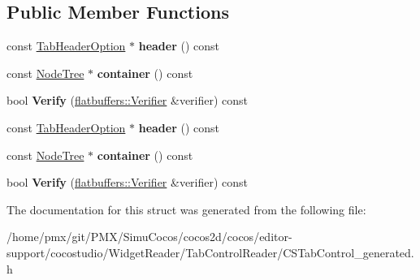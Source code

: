 \subsection*{Public Member Functions}
\begin{DoxyCompactItemize}
\item 
\mbox{\label{structflatbuffers_1_1TabItemOption_a7f8ca6692129f5380eb1d95a66fc40ab}} 
const \hyperlink{structflatbuffers_1_1TabHeaderOption}{Tab\+Header\+Option} $\ast$ {\bfseries header} () const
\item 
\mbox{\label{structflatbuffers_1_1TabItemOption_aa1d6ac89e8f0bde27d856a2922cd267a}} 
const \hyperlink{structflatbuffers_1_1NodeTree}{Node\+Tree} $\ast$ {\bfseries container} () const
\item 
\mbox{\label{structflatbuffers_1_1TabItemOption_a09ea1b5e69643e772f6cd6821c99ac66}} 
bool {\bfseries Verify} (\hyperlink{classflatbuffers_1_1Verifier}{flatbuffers\+::\+Verifier} \&verifier) const
\item 
\mbox{\label{structflatbuffers_1_1TabItemOption_a7f8ca6692129f5380eb1d95a66fc40ab}} 
const \hyperlink{structflatbuffers_1_1TabHeaderOption}{Tab\+Header\+Option} $\ast$ {\bfseries header} () const
\item 
\mbox{\label{structflatbuffers_1_1TabItemOption_aa1d6ac89e8f0bde27d856a2922cd267a}} 
const \hyperlink{structflatbuffers_1_1NodeTree}{Node\+Tree} $\ast$ {\bfseries container} () const
\item 
\mbox{\label{structflatbuffers_1_1TabItemOption_a09ea1b5e69643e772f6cd6821c99ac66}} 
bool {\bfseries Verify} (\hyperlink{classflatbuffers_1_1Verifier}{flatbuffers\+::\+Verifier} \&verifier) const
\end{DoxyCompactItemize}


The documentation for this struct was generated from the following file\+:\begin{DoxyCompactItemize}
\item 
/home/pmx/git/\+P\+M\+X/\+Simu\+Cocos/cocos2d/cocos/editor-\/support/cocostudio/\+Widget\+Reader/\+Tab\+Control\+Reader/C\+S\+Tab\+Control\+\_\+generated.\+h\end{DoxyCompactItemize}

